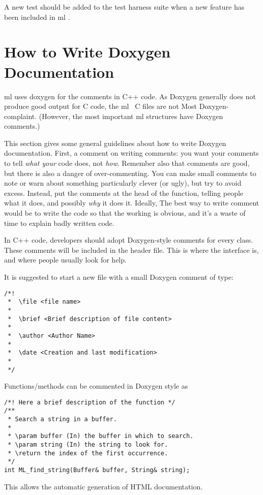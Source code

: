 \documentclass[10pt,letter,relax]{SANDreport}
\newcommand{\ML}     {{\sc ml }}
\begin{document}
A new test should be added to the test harness suite when a new feature
has been included in \ML. 


\section{How to Write Doxygen Documentation}
\label{sec:doxygen}

\ML uses doxygen for the comments in C++ code. As
Doxygen generally does not produce good output for C code, the
\ML\ C files are not Most Doxygen-complaint. (However, the most important
  \ML structures have Doxygen comments.)

This section gives some general guidelines about how to write Doxygen
documentation.  First, a comment on writing comments: you want your comments
to tell {\sl what your} code does, not {\sl how}.  Remember also that comments
are good, but there is also a danger of over-commenting. You can make small
comments to note or warn about something particularly clever (or ugly), but
try to avoid excess.  Instead, put the comments at the head of the function,
telling people what it does, and possibly {\sl why} it does it.  Ideally,
The best way to write comment would be to write the code so that the working
is obvious, and it's a waste of time to explain badly written code.

In C++ code, developers should adopt Doxygen-style comments for every class.
These comments will be included in the header file.  
This is where the  interface is, and where people usually look for help.

It is suggested to start a new file with a small Doxygen comment of type:
\begin{verbatim}
/*!
 *  \file <file name>
 *
 *  \brief <Brief description of file content>
 *
 *  \author <Author Name>
 *
 *  \date <Creation and last modification>
 *
 */
\end{verbatim}

Functions/methods can be commented in Doxygen style as
\begin{verbatim}
/*! Here a brief description of the function */
/**
 * Search a string in a buffer.
 *
 * \param buffer (In) the buffer in which to search.
 * \param string (In) the string to look for.
 * \return the index of the first occurrence.
 */
int ML_find_string(Buffer& buffer, String& string);
\end{verbatim}
This allows the automatic generation of HTML documentation. 
\end{document}
